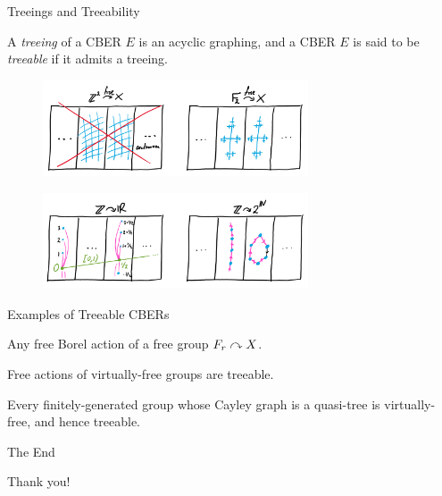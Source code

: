 \documentclass{beamer}
\begin{document}
    \begin{frame}{Treeings and Treeability}
        \begin{definition}
            A \textit{treeing} of a CBER $E$ is an acyclic graphing, and a CBER $E$ is said to be \textit{treeable} if it admits a treeing.
        \end{definition}

        \vspace{-0.14in}

        \begin{figure}[h]
            \center
            \includegraphics[width=0.7\textwidth]{img/not_treeable.png}
        \end{figure}
        \vspace{-0.2in}
        \begin{figure}[h]
            \center
            \includegraphics[width=0.7\textwidth]{img/smooth_hyperfinite.png}
        \end{figure}
    \end{frame}
    \begin{frame}{Examples of Treeable CBERs}
        \begin{example}
            Any free Borel action of a free group $F_r\curvearrowright X$.
        \end{example}

        \pause

        \begin{theorem}[JKL02]
            Free actions of virtually-free groups are treeable.
        \end{theorem}

        \pause

        \begin{theorem}[GdlH90]
            Every finitely-generated group whose Cayley graph is a quasi-tree is virtually-free, and hence treeable.
        \end{theorem}
    \end{frame}
    \begin{frame}{The End}
        \begin{center}
            Thank you!
        \end{center}
    \end{frame}
\end{document}
